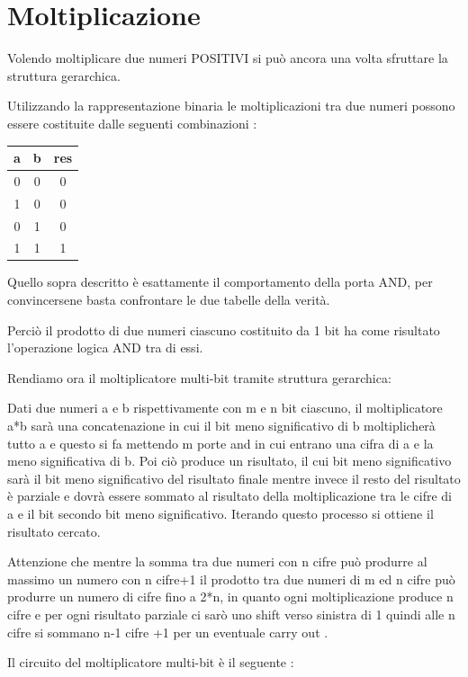 \documentclass[a4paper]{book}
\begin{document}
\newpage
\section{Moltiplicazione}

Volendo moltiplicare due numeri POSITIVI si può ancora una volta sfruttare la struttura gerarchica.

Utilizzando la rappresentazione binaria le moltiplicazioni tra due numeri possono essere costituite dalle seguenti combinazioni :

\begin{tabular}{|c|c|c|}
\hline
a & b & res \\
\hline
0 & 0 & 0 \\
\hline
1 & 0 & 0 \\
\hline
0 & 1 & 0 \\
\hline
1 & 1 & 1 \\
\hline
\end{tabular}

Quello sopra descritto è esattamente il comportamento della porta AND, per convincersene basta confrontare le due tabelle della verità.


Perciò il prodotto di due numeri ciascuno costituito da 1 bit ha come risultato l'operazione logica AND tra di essi.

Rendiamo ora il moltiplicatore multi-bit tramite struttura gerarchica:

Dati due numeri a e b rispettivamente con m e n bit ciascuno, il moltiplicatore a*b sarà una concatenazione in cui il bit meno significativo di b moltiplicherà tutto a e questo si fa mettendo m porte and in cui entrano una cifra di a e la meno significativa di b.
Poi ciò produce un risultato, il cui bit meno significativo sarà il bit meno significativo del risultato finale mentre invece il resto del risultato è parziale e dovrà essere sommato al risultato della moltiplicazione tra le cifre di a e il bit secondo bit meno significativo.
Iterando questo processo si ottiene il risultato cercato.

Attenzione che mentre la somma tra due numeri con n cifre può produrre al massimo un numero con n cifre+1 il prodotto tra due numeri di m ed n cifre può produrre un numero di cifre fino a 2*n, in quanto ogni moltiplicazione produce n cifre e per ogni risultato parziale ci sarò uno shift verso sinistra di 1 quindi alle n cifre si sommano n-1 cifre +1 per un eventuale carry out .

Il circuito del moltiplicatore multi-bit è il seguente :
\end{document}
